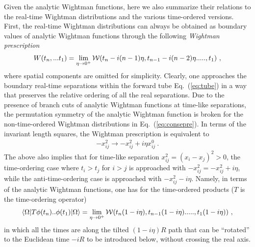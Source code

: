 \documentclass[a4paper,11pt]{article}
\begin{document}
Given the analytic Wightman functions, here we also summarize their relations to the real-time Wightman distributions and the various time-ordered versions. First, the real-time Wightman distributions can always be obtained as boundary values of analytic Wightman functions through the following {\it Wightman prescription}
\begin{align}\label{eq:consepre}
W(t_n,...t_1)=\lim_{\eta\rightarrow 0^+}{\cal W}(t_n-i(n-1)\eta,t_{n-1}-i(n-2)\eta.....,t_1) \ ,
\end{align}
where spatial components are omitted for simplicity. Clearly, one approaches the boundary real-time separations within the forward tube Eq.~(\ref{eq:tube}) in a way that preserves the relative ordering of all the real separations.  Due to the presence of branch cuts of analytic Wightman functions at time-like separations, the permutation symmetry of the analytic Wightman function is broken for the non-time-ordered Wightman distributions in Eq.~(\ref{eq:consepre}).
In terms of the invariant length squares, the Wightman prescription is equivalent to 
\begin{align}
-x_{ij}^2 \rightarrow -x_{ij}^2+i\eta x_{ij}^0 \ .
\end{align}
The above also implies that for time-like separation $x_{ij}^2=(x_{i}-x_{j})^2>0$, the time-ordering case where $t_i>t_j$ for $i>j$ is approached with $-x_{ij}^2=-x_{ij}^2+i\eta$, while the anti-time-ordering case is approached with $-x_{ij}^2-i\eta$. Namely, in terms of the analytic Wightman functions, one has for the time-ordered products ($T$ is the time-ordering operator)
\begin{align}\label{eq:i0forT}
\langle \Omega|T\phi(t_n)..\phi(t_1) |\Omega\rangle=\lim_{\eta\rightarrow 0^+}{\cal W}(t_n(1-i\eta),t_{n-1}(1-i\eta).....,t_1(1-i\eta))  \ ,
\end{align}
in which all the times are along the tilted $(1-i\eta)R$ path that can be ``rotated'' to the Euclidean time $-iR$ to be introduced below,  without crossing the real axis.
\end{document}
